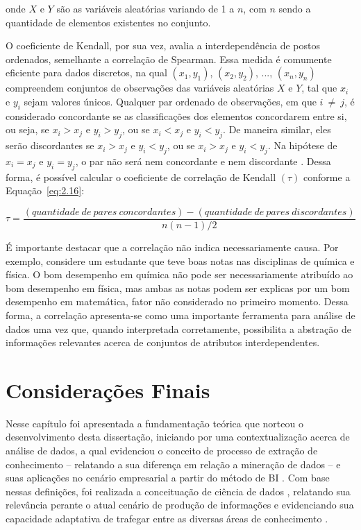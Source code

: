\noindent onde $X$ e $Y$ são as variáveis aleatórias variando de 1 a $n$, com $n$ sendo a quantidade de elementos existentes no conjunto.

O coeficiente de Kendall, por sua vez, avalia a interdependência de postos ordenados, semelhante a correlação de Spearman. Essa medida é comumente eficiente para dados discretos, na qual $\left(x_1, y_1\right)$, $\left(x_2, y_2\right)$, ..., $\left(x_n, y_n\right)$ compreendem conjuntos de observações das variáveis aleatórias $X$ e $Y$, tal que $x_i$ e $y_i$ sejam valores únicos. Qualquer par ordenado de observações, em que $i\ \neq\ j$, é considerado concordante se as classificações dos elementos concordarem entre si, ou seja, se $x_i > x_j$ e $y_i > y_j$, ou se $x_i < x_j$ e $y_i < y_j$. De maneira similar, eles serão discordantes se $x_i > x_j$ e $y_i < y_j$, ou se $x_i > x_j$ e $y_i < y_j$. Na hipótese de $x_i = x_j$ e $y_i = y_j$, o par não será nem concordante e nem discordante \cite{cap02_ref42, cap02_ref39}. Dessa forma, é possível calcular o coeficiente de correlação de Kendall $(\tau)$ conforme a Equação~\ref{eq:2.16}:

\begin{equation}
    \tau = \frac{(quantidade \ de \ pares \ concordantes) - (quantidade \ de \ pares \ discordantes)}{n(n - 1)/2}
    \label{eq:2.16}
\end{equation}

É importante destacar que a correlação não indica necessariamente causa. Por exemplo, considere um estudante que teve boas notas nas disciplinas de química e física. O bom desempenho em química não pode ser necessariamente atribuído ao bom desempenho em física, mas ambas as notas podem ser explicas por um bom desempenho em matemática, fator não considerado no primeiro momento. Dessa forma, a correlação apresenta-se como uma importante ferramenta para análise de dados uma vez que, quando interpretada corretamente, possibilita a abstração de informações relevantes acerca de conjuntos de atributos interdependentes.

\section{Considerações Finais}

Nesse capítulo foi apresentada a fundamentação teórica que norteou o desenvolvimento desta dissertação, iniciando por uma contextualização acerca de análise de dados, a qual evidenciou o conceito de processo de extração de conhecimento \cite{cap02_ref12} – relatando a sua diferença em relação a mineração de dados \cite{cap02_ref5} – e suas aplicações no cenário empresarial a partir do método de BI \cite{cap02_ref15, cap02_ref16}. Com base nessas definições, foi realizada a conceituação de ciência de dados \cite{cap02_ref9, cap02_ref1, cap02_ref3}, relatando sua relevância perante o atual cenário de produção de informações \cite{cap02_ref4} e evidenciando sua capacidade adaptativa de trafegar entre as diversas áreas de conhecimento \cite{cap02_ref2}.

